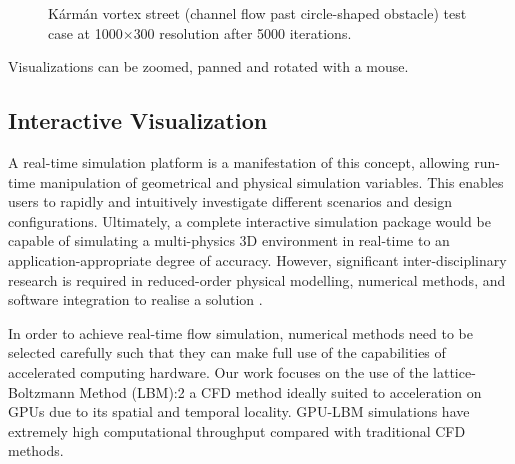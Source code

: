 \begin{figure}[!ht]
	\centering
	 \par
	\caption{Kármán vortex street (channel flow past circle-shaped obstacle) test case at 1000$\times$300 resolution after 5000 iterations.}
	\label{fig:d2q9_channel}
\end{figure}

Visualizations can be zoomed, panned and rotated with a mouse.

\subsection{Interactive Visualization}
\label{interactive-simulation}

A real-time simulation platform is a manifestation of this concept, allowing run-time manipulation of geometrical and physical simulation variables. This enables users to rapidly and intuitively investigate different scenarios and design configurations. Ultimately, a complete interactive simulation package would be capable of simulating a multi-physics 3D environment in real-time to an application-appropriate degree of accuracy. However, significant inter-disciplinary research is required in reduced-order physical modelling, numerical methods, and software integration to realise a solution \citep{harwoodREALTIMEMODELLINGSIMULATION}.

In order to achieve real-time flow simulation, numerical methods need to be selected carefully such that they can make full use of the capabilities of accelerated computing hardware. Our work focuses on the use of the lattice-Boltzmann Method (LBM):2 a CFD method ideally suited to acceleration on GPUs due to its spatial and temporal locality. GPU-LBM simulations have extremely high computational throughput compared with traditional CFD methods.

